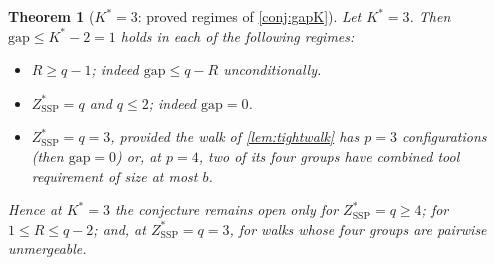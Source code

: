 \documentclass[11pt,a4paper]{article}
\theoremstyle{plain}
\newtheorem{theorem}{Theorem}[section]
\theoremstyle{definition}
\newcommand{\Kstar}{K^{*}}
\newcommand{\ZSSP}{Z_{\mathrm{SSP}}^{*}}
\begin{document}
\begin{thmbox}
\begin{theorem}[$\Kstar=3$: proved regimes of \cref{conj:gapK}]
\label{thm:k3regions}
Let $\Kstar=3$. Then $\mathrm{gap}\le\Kstar-2=1$ holds in each of the following
regimes:
\begin{itemize}
\item[(i)] $R\ge q-1$; indeed $\mathrm{gap}\le q-R$ unconditionally.
\item[(ii)] $\ZSSP=q$ and $q\le2$; indeed $\mathrm{gap}=0$.
\item[(iii)] $\ZSSP=q=3$, provided the walk of \cref{lem:tightwalk} has $p=3$
configurations (then $\mathrm{gap}=0$) or, at $p=4$, two of its four groups have
combined tool requirement of size at most $b$.
\end{itemize}
Hence at $\Kstar=3$ the conjecture remains open only for $\ZSSP=q\ge4$; for
$1\le R\le q-2$; and, at $\ZSSP=q=3$, for walks whose four groups are pairwise
unmergeable.
\end{theorem}
\end{thmbox}
\end{document}
